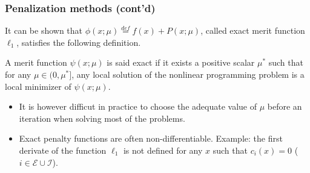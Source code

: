 \begin{frame}
\frametitle{Penalization methods (cont'd)}

It can be shown that $\phi(x; \mu) \overset{def}{=} f(x) + P(x;\mu)$, called {\blue exact merit function $\ell_1$}, satisfies the following definition.
\begin{definition}
A merit function $\psi(x; \mu)$ is said exact if it exists a positive scalar  $\mu^*$ such that for any $\mu \in (0, \mu^*]$, any local solution of the nonlinear programming problem is a local minimizer of $\psi(x;\mu)$.
\end{definition}

\begin{itemize}
\item
It is however difficut in practice to choose the adequate value of  $\mu$ before an iteration when solving most of the problems.
\item
Exact penalty functions are often non-differentiable.
Example: the first derivate of the function $\ell_1$ is not defined for any $x$ such that $c_i(x) =
0$ ($i \in \mathcal{E} \cup \mathcal{I}$).
\end{itemize}

\end{frame}

